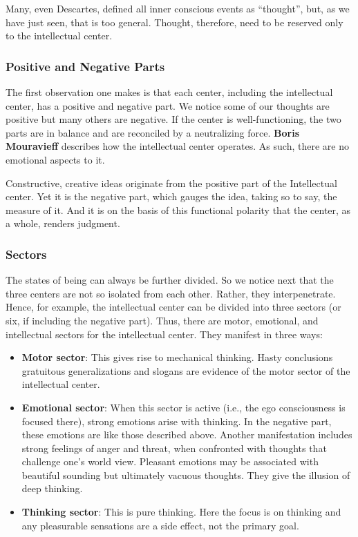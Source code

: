 Many, even Descartes, defined all inner conscious events as ``thought'', but, as we have just seen, that is too general. Thought, therefore, need to be reserved only to the intellectual center.

\subsubsection{Positive and Negative Parts}

The first observation one makes is that each center, including the intellectual center, has a positive and negative part. We notice some of our thoughts are positive but many others are negative. If the center is well-functioning, the two parts are in balance and are reconciled by a neutralizing force. \textbf{Boris Mouravieff} describes how the intellectual center operates. As such, there are no emotional aspects to it.

\begin{quotex}
Constructive, creative ideas originate from the positive part of the Intellectual center. Yet it is the negative part, which gauges the idea, taking so to say, the measure of it. And it is on the basis of this functional polarity that the center, as a whole, renders judgment.
\end{quotex}


\subsubsection{Sectors}


The states of being can always be further divided. So we notice next that the three centers are not so isolated from each other. Rather, they interpenetrate. Hence, for example, the intellectual center can be divided into three sectors (or six, if including the negative part). Thus, there are motor, emotional, and intellectual sectors for the intellectual center. They manifest in three ways:

\begin{itemize}


\item \textbf{Motor sector}: This gives rise to mechanical thinking. Hasty conclusions gratuitous generalizations and slogans are evidence of the motor sector of the intellectual center.

\item \textbf{Emotional sector}: When this sector is active (i.e., the ego consciousness is focused there), strong emotions arise with thinking. In the negative part, these emotions are like those described above. Another manifestation includes strong feelings of anger and threat, when confronted with thoughts that challenge one's world view. Pleasant emotions may be associated with beautiful sounding but ultimately vacuous thoughts. They give the illusion of deep thinking.

\item \textbf{Thinking sector}: This is pure thinking. Here the focus is on thinking and any pleasurable sensations are a side effect, not the primary goal.
\end{itemize}


